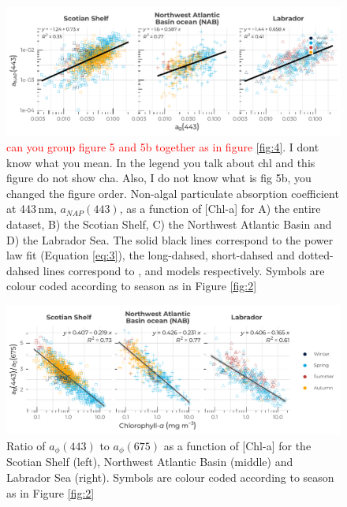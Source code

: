 \documentclass[utf8]{frontiersSCNS} %
\begin{document}
\begin{figure}[h!]
\begin{center}
\includegraphics[width=16cm]{fig05.pdf}
\end{center}
\caption{\textcolor{red}{can you group figure 5 and 5b together as in figure \ref{fig:4}}. I dont know what you mean. In the legend you talk about chl and this figure do not show cha. Also, I do not know what is fig 5b, you changed the figure order. Non-algal particulate absorption coefficient at 443\,nm, $a_{NAP}(443)$, as a function of [Chl-a] for A) the entire dataset, B) the Scotian Shelf, C) the Northwest Atlantic Basin and D) the Labrador Sea. The solid black lines correspond to the power law fit (Equation \ref{eq:3}), the long-dahsed, short-dahsed and dotted-dahsed lines correspond to \cite{bricaud1998}, \cite{bricaud2004} and \cite{devred2006} models respectively. Symbols are colour coded according to season as in Figure \ref{fig:2}}\label{fig:5}
\end{figure}

\begin{figure}[h!]
\begin{center}
\includegraphics[width=16cm]{fig06.pdf}
\end{center}
\caption{Ratio of $a_\phi(443)$ to $a_\phi(675)$ as a function of [Chl-a] for the Scotian Shelf (left), Northwest Atlantic Basin (middle) and Labrador Sea (right). Symbols are colour coded according to season as in Figure \ref{fig:2}}\label{fig:6}
\end{figure}
\end{document}
